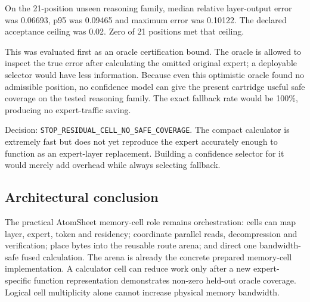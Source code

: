 On the 21-position unseen reasoning family, median relative layer-output error
was 0.06693, p95 was 0.09465 and maximum error was 0.10122.  The declared
acceptance ceiling was 0.02.  Zero of 21 positions met that ceiling.

This was evaluated first as an oracle certification bound.  The oracle is
allowed to inspect the true error after calculating the omitted original
expert; a deployable selector would have less information.  Because even this
optimistic oracle found no admissible position, no confidence model can give
the present cartridge useful safe coverage on the tested reasoning family.
The exact fallback rate would be 100\%, producing no expert-traffic saving.

Decision: \texttt{STOP\_RESIDUAL\_CELL\_NO\_SAFE\_COVERAGE}.  The compact
calculator is extremely fast but does not yet reproduce the expert accurately
enough to function as an expert-layer replacement.  Building a confidence
selector for it would merely add overhead while always selecting fallback.

\subsection{Architectural conclusion}

The practical AtomSheet memory-cell role remains orchestration: cells can map
layer, expert, token and residency; coordinate parallel reads, decompression
and verification; place bytes into the reusable route arena; and direct one
bandwidth-safe fused calculation.  The arena is already the concrete prepared
memory-cell implementation.  A calculator cell can reduce work only after a
new expert-specific function representation demonstrates non-zero held-out
oracle coverage.  Logical cell multiplicity alone cannot increase physical
memory bandwidth.

